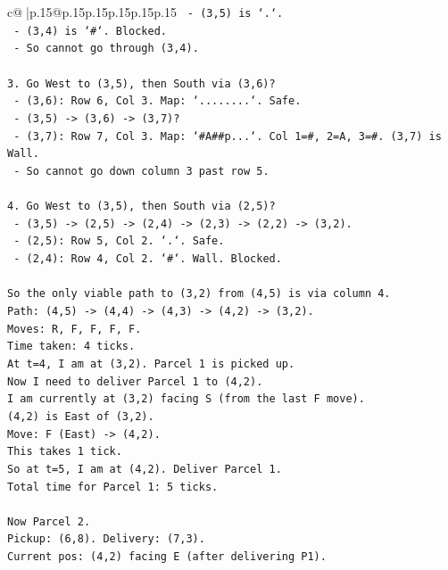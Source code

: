 \documentclass{article}
\begin{document}
{\begin{supertabular}{c@{$\;$}|p{.15\linewidth}@{}p{.15\linewidth}p{.15\linewidth}p{.15\linewidth}p{.15\linewidth}p{.15\linewidth}}
{{{\texttt{   {-} (3,5) is `.`.} \\
\texttt{   {-} (3,4) is `\#`. Blocked.} \\
\texttt{   {-} So cannot go through (3,4).} \\
\\ 
\texttt{3. Go West to (3,5), then South via (3,6)?} \\
\texttt{   {-} (3,6): Row 6, Col 3. Map: `........`. Safe.} \\
\texttt{   {-} (3,5) {-}> (3,6) {-}> (3,7)?} \\
\texttt{   {-} (3,7): Row 7, Col 3. Map: `\#A\#\#p...`. Col 1=\#, 2=A, 3=\#. (3,7) is Wall.} \\
\texttt{   {-} So cannot go down column 3 past row 5.} \\
\\ 
\texttt{4. Go West to (3,5), then South via (2,5)?} \\
\texttt{   {-} (3,5) {-}> (2,5) {-}> (2,4) {-}> (2,3) {-}> (2,2) {-}> (3,2).} \\
\texttt{   {-} (2,5): Row 5, Col 2. `.`. Safe.} \\
\texttt{   {-} (2,4): Row 4, Col 2. `\#`. Wall. Blocked.} \\
\\ 
\texttt{So the only viable path to (3,2) from (4,5) is via column 4.} \\
\texttt{Path: (4,5) {-}> (4,4) {-}> (4,3) {-}> (4,2) {-}> (3,2).} \\
\texttt{Moves: R, F, F, F, F.} \\
\texttt{Time taken: 4 ticks.} \\
\texttt{At t=4, I am at (3,2). Parcel 1 is picked up.} \\
\texttt{Now I need to deliver Parcel 1 to (4,2).} \\
\texttt{I am currently at (3,2) facing S (from the last F move).} \\
\texttt{(4,2) is East of (3,2).} \\
\texttt{Move: F (East) {-}> (4,2).} \\
\texttt{This takes 1 tick.} \\
\texttt{So at t=5, I am at (4,2). Deliver Parcel 1.} \\
\texttt{Total time for Parcel 1: 5 ticks.} \\
\\ 
\texttt{Now Parcel 2.} \\
\texttt{Pickup: (6,8). Delivery: (7,3).} \\
\texttt{Current pos: (4,2) facing E (after delivering P1).} \\
}}}
\end{supertabular}}
\end{document}
